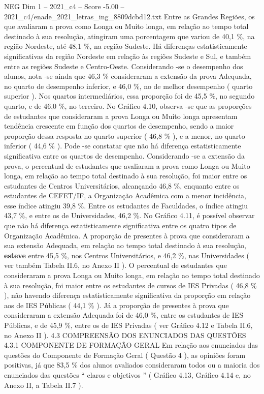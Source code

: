 \begin{textsample}{NEG Dim 1 – 2021\_c4 – Score -5.00 – 2021\_c4/enade\_2021\_letras\_ing\_8809dcbd12.txt}
Entre as Grandes Regiões, os que avaliaram a prova como Longa ou Muito longa, em relação ao tempo total destinado à sua resolução, atingiram uma porcentagem que variou de 40,1 \%, na região Nordeste, até 48,1 \%, na região Sudeste.
Há diferenças estatisticamente significativas da região Nordeste em relação às regiões Sudeste e Sul, e também entre as regiões Sudeste e Centro-Oeste.
Considerando -se o desempenho dos alunos, nota -se ainda que 46,3 \% consideraram a extensão da prova Adequada, no quarto de desempenho inferior, e 46,0 \%, no de melhor desempenho ( quarto superior ).
Nos quartos intermediários, essa proporção foi de 45,5 \%, no segundo quarto, e de 46,0 \%, no terceiro.
No Gráfico 4.10, observa -se que as proporções de estudantes que consideraram a prova Longa ou Muito longa apresentam tendência crescente em função dos quartos de desempenho, sendo a maior proporção dessa resposta no quarto superior ( 46,8 \% ), e a menor, no quarto inferior ( 44,6 \% ).
Pode -se constatar que não há diferença estatisticamente significativa entre os quartos de desempenho.
Considerando -se a extensão da prova, o percentual de estudantes que avaliaram a prova como Longa ou Muito longa, em relação ao tempo total destinado à sua resolução, foi maior entre os estudantes de Centros Universitários, alcançando 46,8 \%, enquanto entre os estudantes de CEFET/IF, a Organização Acadêmica com a menor incidência, esse índice atingiu 39,8 \%.
Entre os estudantes de Faculdades, o índice atingiu 43,7 \%, e entre os de Universidades, 46,2 \%.
No Gráfico 4.11, é possível observar que não há diferença estatisticamente significativa entre os quatro tipos de Organização Acadêmica.
A proporção de presentes à prova que consideraram a sua extensão Adequada, em relação ao tempo total destinado à sua resolução, \textbf{esteve} entre 45,5 \%, nos Centros Universitários, e 46,2 \%, nas Universidades ( ver também Tabela II.6, no Anexo II ).
O percentual de estudantes que consideraram a prova Longa ou Muito longa, em relação ao tempo total destinado à sua resolução, foi maior entre os estudantes de cursos de IES Privadas ( 46,8 \% ), não havendo diferença estatisticamente significativa da proporção em relação aos de IES Públicas ( 44,1 \% ).
Já a proporção de presentes à prova que consideraram a extensão Adequada foi de 46,0 \%, entre os estudantes de IES Públicas, e de 45,9 \%, entre os de IES Privadas ( ver Gráfico 4.12 e Tabela II.6, no Anexo II ). 4.3 COMPREENSÃO DOS ENUNCIADOS DAS QUESTÕES 4.3.1 COMPONENTE DE FORMAÇÃO GERAL Em relação aos enunciados das questões do Componente de Formação Geral ( Questão 4 ), as opiniões foram positivas, já que 83,5 \% dos alunos avaliados consideraram todos ou a maioria dos enunciados das questões “ claros e objetivos ” ( Gráfico 4.13, Gráfico 4.14 e, no Anexo II, a Tabela II.7 ).

\end{textsample}

